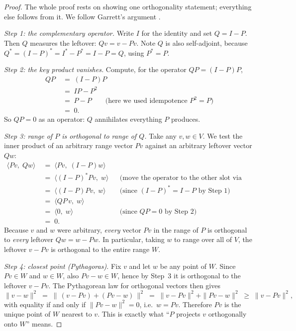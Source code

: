 \begin{proof}
The whole proof rests on showing one orthogonality statement; everything else follows
from it. We follow Garrett's argument \citep{projectors_garrett}.

\emph{Step 1: the complementary operator.} Write $I$ for the identity and set $Q = I -
P$. Then $Q$ measures the leftover: $Qv = v - Pv$. Note $Q$ is also self-adjoint,
because $Q^\ast = (I - P)^\ast = I^\ast - P^\ast = I - P = Q$, using $P^\ast = P$.

\emph{Step 2: the key product vanishes.} Compute, for the operator $QP = (I-P)P$,
\begin{align*}
  QP \;&=\; (I - P)P \\
     \;&=\; IP - P^2 \\
     \;&=\; P - P \qquad\text{(here we used idempotence $P^2 = P$)} \\
     \;&=\; 0 .
\end{align*}
So $QP = 0$ as an operator: $Q$ annihilates everything $P$ produces.

\emph{Step 3: range of $P$ is orthogonal to range of $Q$.} Take any $v, w \in V$. We
test the inner product of an arbitrary range vector $Pv$ against an arbitrary leftover
vector $Qw$:
\begin{align*}
  \langle Pv,\; Qw \rangle
    \;&=\; \langle Pv,\; (I-P)w \rangle \\
    \;&=\; \langle (I-P)^\ast Pv,\; w \rangle
        &&\text{(move the operator to the other slot via the adjoint)} \\
    \;&=\; \langle (I-P) Pv,\; w \rangle
        &&\text{(since $(I-P)^\ast = I-P$ by Step 1)} \\
    \;&=\; \langle QP\, v,\; w \rangle \\
    \;&=\; \langle 0,\; w \rangle
        &&\text{(since $QP = 0$ by Step 2)} \\
    \;&=\; 0 .
\end{align*}
Because $v$ and $w$ were arbitrary, \emph{every} vector $Pv$ in the range of $P$ is
orthogonal to \emph{every} leftover $Qw = w - Pw$. In particular, taking $w$ to range
over all of $V$, the leftover $v - Pv$ is orthogonal to the entire range $W$.

\emph{Step 4: closest point (Pythagoras).} Fix $v$ and let $w$ be any point of $W$.
Since $Pv \in W$ and $w \in W$, also $Pv - w \in W$, hence by Step~3 it is orthogonal
to the leftover $v - Pv$. The Pythagorean law for orthogonal vectors
\citep{fourier_rutgers} then gives
\[
  \|v - w\|^2 \;=\; \|\,(v - Pv) + (Pv - w)\,\|^2
              \;=\; \|v - Pv\|^2 + \|Pv - w\|^2
              \;\ge\; \|v - Pv\|^2,
\]
with equality if and only if $\|Pv - w\|^2 = 0$, i.e.\ $w = Pv$. Therefore $Pv$ is the
unique point of $W$ nearest to $v$. This is exactly what ``$P$ projects $v$
orthogonally onto $W$'' means.
\end{proof}

